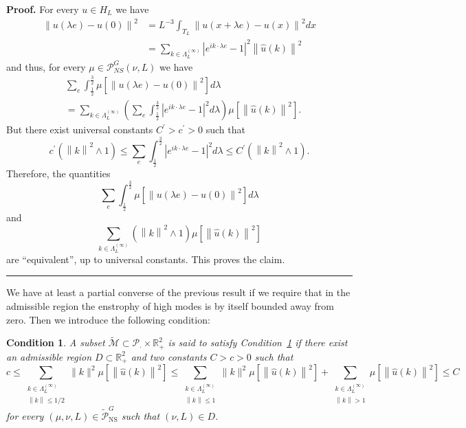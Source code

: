\documentclass[11pt]{preprint}
\newtheorem{condition}{Condition}
\newenvironment{proof}[1][Proof]{\textbf{#1.} }{\ \rule{0.5em}{0.5em}}
\begin{document}
\begin{proof}
For every $u\in H_{L}$ we have
\begin{align*}
\left\|  u\left(  \lambda e\right)  -u(0)\right\|  ^{2}  & =L^{-3}\int_{T_{L}%
}\left\|  u\left(  x+\lambda e\right)  -u\left(  x\right)  \right\|  ^{2}dx\\
& =\sum_{k\in\Lambda^{(\infty)}_L}\left|  e^{ik\cdot\lambda e
}-1\right|  ^{2}\left\|  \widehat{u}\left(  k\right)  \right\|  ^{2}%
\end{align*}
and thus, for every $\mu\in\mathcal{P}_{NS}^{G}\left(  \nu,L\right)  $ we
have
\begin{align*}
& \sum_{e}\int_{\frac{1}{2}}^{\frac{3}{2}}\mu\left[  \left\|  u\left(  \lambda
e\right)  -u(0)\right\|  ^{2}\right]  d\lambda\\
& =\sum_{k\in\Lambda^{(\infty)}_L}\left(  \sum_{e}\int
_{\frac{1}{2}}^{\frac{3}{2}}\left|  e^{ik\cdot\lambda e}-1\right|
^{2}d\lambda\right)  \mu\left[  \left\|  \widehat{u}\left(  k\right)
\right\|  ^{2}\right]  .
\end{align*}
But there exist universal constants $C^{\prime}>c^{\prime}>0$ such that
\[
c^{\prime}(\left\|k\right\|^{2}\wedge1)\leq\sum_{e}%
\int_{\frac{1}{2}}^{\frac{3}{2}}\left|  e^{ik\cdot\lambda e}-1\right|
^{2}d\lambda\leq C^{\prime}(\left\|k\right\|^{2}\wedge1).
\]
Therefore, the quantities
\[
\sum_{e}\int_{\frac{1}{2}}^{\frac{3}{2}}\mu\left[  \left\|  u\left(  \lambda
e\right)  -u(0)\right\|  ^{2}\right]  d\lambda
\]
and
\[
\sum_{k\in\Lambda^{(\infty)}_L}\left(\left\|k\right\|^{2}
\wedge1\right)  \mu\left[  \left\|  \widehat{u}\left(  k\right)  \right\|
^{2}\right]
\]
are ``equivalent'', up to universal constants. This proves the claim.
\end{proof}

We have at least a partial converse of the previous result if we require that in the admissible region the enstrophy of high modes is by itself bounded away from zero. Then we introduce the following condition:

\begin{condition}
\label{condC} A subset $\tilde{\mathcal{M}}\subset\mathcal{P}_{\cdot}%
\times\mathbb{R}_{+}^{2}$ is said to satisfy Condition~\ref{condC} if there
exist an admissible region $D\subset\mathbb{R}_{+}^{2}$ and two constants
$C>c>0$ such that
\[
c\leq
\sum_{\substack{k\in\Lambda_{L}^{\left(  \infty\right)  }\\\left\|
k\right\|  \leq 1/2}}\|k\|^2\mu\left[  \left\|  \widehat
{u}\left(  k\right)  \right\|  ^{2}\right]
\leq\sum_{\substack{k\in\Lambda_{L}^{\left(  \infty\right)  }\\\left\|
k\right\|  \leq 1}}\|k\|^2\mu\left[  \left\|  \widehat
{u}\left(  k\right)  \right\|  ^{2}\right]  +\sum_{\substack{k\in\Lambda
_{L}^{\left(  \infty\right)  }\\\left\|  k\right\|  >1}}\mu\left[  \left\|
\widehat{u}\left(  k\right)  \right\|  ^{2}\right]  \leq C
\]
for every $(\mu,\nu,L)\in\tilde{\mathcal{P}}_{{\mathrm{NS}}}^{G}$ such that
$(\nu,L)\in D$. 
\end{condition}
\end{document}
